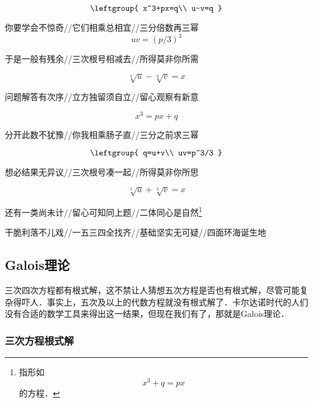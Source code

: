\begin{equation}
\leftgroup{
    x^3+px=q\\
    u-v=q
}
\end{equation}

你要学会不惊奇//它们相乘总相宜//三分倍数再三幂
\begin{equation}
uv=(p/3)^3
\end{equation}

于是一般有残余//三次根号相减去//所得莫非你所需

\begin{equation}
\sqrt[3]{u}-\sqrt[3]{v}=x
\end{equation}


问题解答有次序//立方独留须自立//留心观察有新意

\begin{equation}
x^3=px+q
\end{equation}

分开此数不犹豫//你我相乘肠子直//三分之前求三幂

\begin{equation}
\leftgroup{
    q=u+v\\
    uv=p^3/3
}
\end{equation}

想必结果无异议//三次根号凑一起//所得莫非你所思

\begin{equation}
\sqrt[3]{u}+\sqrt[3]{v}=x
\end{equation}


还有一类尚未计//留心可知同上题//二体同心是自然\footnote{指形如
\begin{equation}
x^3+q=px
\end{equation}
的方程．}


干脆利落不儿戏//一五三四全找齐//基础坚实无可疑//四面环海诞生地






\subsection{Galois理论}\label{PlyRtS_sub1}

三次四次方程都有根式解，这不禁让人猜想五次方程是否也有根式解，尽管可能复杂得吓人．事实上，五次及以上的代数方程就没有根式解了．卡尔达诺时代的人们没有合适的数学工具来得出这一结果，但现在我们有了，那就是Galois理论．








\subsubsection{三次方程根式解}


